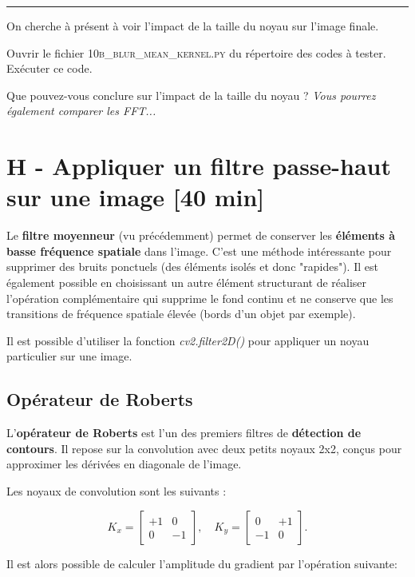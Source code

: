 \noindent \rule{\linewidth}{1pt}

On cherche à présent à voir l'impact de la taille du noyau sur l'image finale.

\Manip Ouvrir le fichier \textsc{10b\_blur\_mean\_kernel.py} du répertoire des codes à tester. Exécuter ce code.

\Quest Que pouvez-vous conclure sur l'impact de la taille du noyau ? \textit{Vous pourrez également comparer les FFT...}

\newpage

\section{H - Appliquer un filtre passe-haut sur une image {[40 min]}}


Le \textbf{filtre moyenneur} (vu précédemment) permet de conserver les \textbf{éléments à basse fréquence spatiale} dans l'image. C'est une méthode intéressante pour supprimer des bruits ponctuels (des éléments isolés et donc "rapides"). Il est également possible en choisissant un autre élément structurant de réaliser l'opération complémentaire qui supprime le fond continu et ne conserve que les transitions de fréquence spatiale élevée (bords d'un objet par exemple).

\medskip

Il est possible d'utiliser la fonction \textsl{cv2.filter2D()} pour appliquer un noyau particulier sur une image.

\subsection{Opérateur de Roberts}

L'\textbf{opérateur de Roberts} est l'un des premiers filtres de \textbf{détection de contours}. Il repose sur la convolution avec deux petits noyaux 2x2, conçus pour approximer les dérivées en diagonale de l'image.

Les noyaux de convolution sont les suivants :

$$K_x = \begin{bmatrix}
+1 & 0 \\
0 & -1
\end{bmatrix},
\quad
K_y =
\begin{bmatrix}
0 & +1 \\
-1 & 0
\end{bmatrix}.
$$

Il est alors possible de calculer l'amplitude du gradient par l'opération suivante: 

